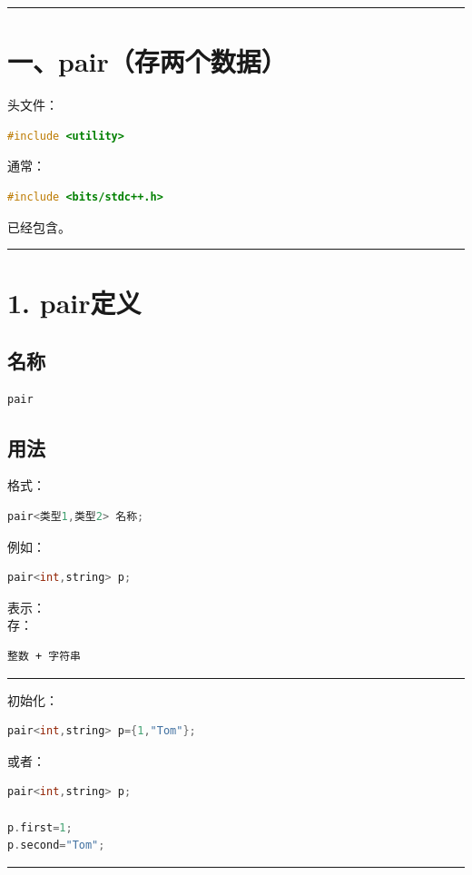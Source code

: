 \documentclass[9pt,twocolumn]{extarticle}
\begin{document}
\noindent\rule{\linewidth}{0.4pt}

\section{一、pair（存两个数据）}

头文件：
\begin{lstlisting}[language=C++]
#include <utility>
\end{lstlisting}
通常：
\begin{lstlisting}[language=C++]
#include <bits/stdc++.h>
\end{lstlisting}
已经包含。

\noindent\rule{\linewidth}{0.4pt}

\section{1. pair定义}

\subsection{名称}
\begin{lstlisting}[language=C++]
pair
\end{lstlisting}

\subsection{用法}
格式：
\begin{lstlisting}[language=C++]
pair<类型1,类型2> 名称;
\end{lstlisting}
例如：
\begin{lstlisting}[language=C++]
pair<int,string> p;
\end{lstlisting}
表示：\\
存：
\begin{lstlisting}
整数 + 字符串
\end{lstlisting}

\noindent\rule{\linewidth}{0.4pt}

初始化：
\begin{lstlisting}[language=C++]
pair<int,string> p={1,"Tom"};
\end{lstlisting}
或者：
\begin{lstlisting}[language=C++]
pair<int,string> p;

p.first=1;
p.second="Tom";
\end{lstlisting}

\noindent\rule{\linewidth}{0.4pt}
\end{document}
